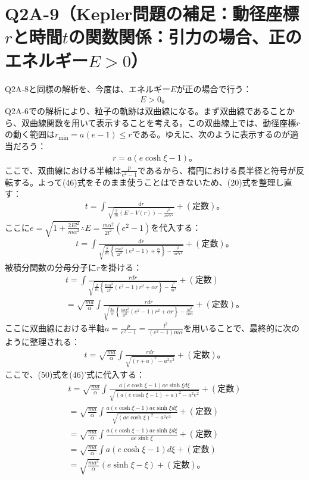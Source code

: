   \section{Q2A-9（Kepler問題の補足：動径座標$r$と時間$t$の関数関係：引力の場合、正のエネルギー$E>0$）}
  Q2A-8と同様の解析を、今度は、エネルギー$E$が正の場合で行う：
  \begin{align*}
    E>0。\tag{49}
  \end{align*}
  Q2A-6での解析により、粒子の軌跡は双曲線になる。まず双曲線であることから、双曲線関数を用いて表示することを考える。この双曲線上では、動径座標$r$の動く範囲は$r_{\min}=a(e-1)\leq r$である。ゆえに、次のように表示するのが適当だろう：
  \begin{align*}
    r=a(e\cosh\xi-1)。\tag{50}
  \end{align*}
  ここで、双曲線における半軸は$\frac{p}{e^2-1}$であるから、楕円における長半径と符号が反転する。よって(46)式をそのまま使うことはできないため、(20)式を整理し直す：
  \begin{align*}
    t = \int \frac{dr}{\sqrt{\frac2m\left(E-V(r)\right)-\frac{l^2}{m^2r^2}}} + (定数)。
  \end{align*}
  ここに$e=\sqrt{1+\frac{2El^2}{m\alpha^2}}\therefore E=\frac{m\alpha^2}{2l^2}(e^2-1)$を代入する：
  \begin{align*}
    t=\int \frac{dr}{\sqrt{\frac{2}{m} \left\{\frac{m\alpha^2}{2l^2}(e^2-1)+\frac{\alpha}{r}\right\}-\frac{l^2}{m^2r^2}}}+(定数)。
  \end{align*}
  被積分関数の分母分子に$r$を掛ける：
  \begin{align*}
    t=\int \frac{rdr}{\sqrt{\frac{2}{m} \left\{\frac{m\alpha^2}{2l^2}(e^2-1)r^2+\alpha r\right\}-\frac{l^2}{m^2}}}+(定数)\\
    =\sqrt{\frac{ma}{\alpha}}\int \frac{rdr}{\sqrt{\frac{2a}{\alpha}\left\{\frac{m\alpha^2}{2l^2}(e^2-1)r^2+\alpha r\right\}-\frac{al^2}{\alpha m}}}+(定数)。
  \end{align*}
  ここに双曲線における半軸$a=\frac{p}{e^2-1}=\frac{l^2}{(e^2-1)m\alpha}$を用いることで、最終的に次のように整理される：
  \begin{align*}
    t=\sqrt{\frac{ma}{\alpha}}\int \frac{rdr}{\sqrt{(r+a)^2-a^2e^2}}+(定数)。\tag*{(46)'}
  \end{align*}
  ここで、(50)式を(46)'式に代入する：
  \begin{align*}
    t=\sqrt{\frac{ma}{\alpha}}\int \frac{a(e\cosh\xi-1)ae\sinh\xi d\xi}{\sqrt{(a(e\cosh\xi-1)+a)^2-a^2e^2}}+(定数)\\
    =\sqrt{\frac{ma}{\alpha}}\int \frac{a(e\cosh\xi-1)ae\sinh\xi d\xi}{\sqrt{(ae\cosh\xi)^2-a^2e^2}}+(定数)\\
    =\sqrt{\frac{ma}{\alpha}}\int \frac{a(e\cosh\xi-1)ae\sinh\xi d\xi}{ae\sinh\xi}+(定数)\\
    =\sqrt{\frac{ma}{\alpha}}\int a(e\cosh\xi-1)d\xi+(定数)\\
    =\sqrt{\frac{ma^3}{\alpha}}\left(e\sinh\xi-\xi\right)+(定数)。
  \end{align*}
